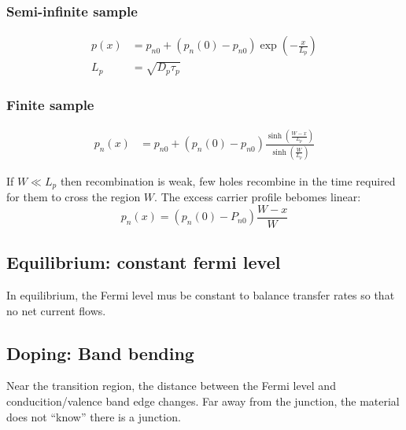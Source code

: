 \documentclass[a4paper, fontsize=8pt, landscape, DIV=1]{scrartcl}
\begin{document}
\begin{multicols*}{4}
    \subsubsection{Semi-infinite sample}
    \begin{align*}
      p(x) &= p_{n0} + (p_n(0)-p_{n0}) \exp\left(-\frac{x}{L_p}\right) \\
      L_p &= \sqrt{D_p\tau_p}
    \end{align*}

    \subsubsection{Finite sample}
    \begin{align*}
      p_n(x) &= p_{n0} + (p_n(0)-p_{n0}) \frac{\sinh\left(\frac{W-x}{L_p}\right)}{\sinh\left(\frac{W}{L_p}\right)}
    \end{align*}

    If $W \ll L_p$ then recombination is weak, few holes recombine in the time required for them to cross the region $W$.
    The excess carrier profile bebomes linear:
    \[p_n(x) = (p_n(0)-P_{n0})\frac{W-x}{W}\]





  \subsection{Equilibrium: constant fermi level}
  In equilibrium, the Fermi level mus be constant to balance transfer rates so that no net current flows.


  \subsection{Doping: Band bending}
  Near the transition region, the distance between the Fermi level and conducition/valence band edge changes.
  Far away from the junction, the material does not ``know'' there is a junction.



\end{multicols*}

\setcounter{secnumdepth}{2}
\end{document}
